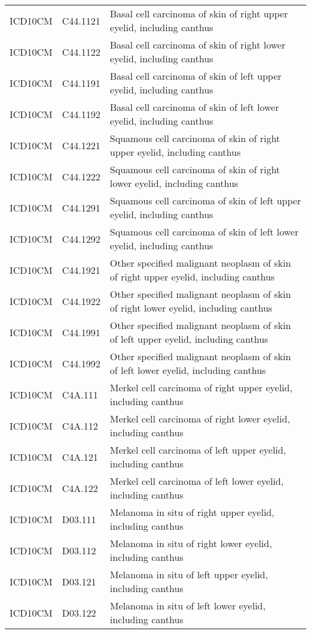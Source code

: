 \begin{longtable}{p{}p{}p{}}
  ICD10CM & C44.1121 & Basal cell carcinoma of skin of right upper eyelid, including canthus \\ 
  ICD10CM & C44.1122 & Basal cell carcinoma of skin of right lower eyelid, including canthus \\ 
  ICD10CM & C44.1191 & Basal cell carcinoma of skin of left upper eyelid, including canthus \\ 
  ICD10CM & C44.1192 & Basal cell carcinoma of skin of left lower eyelid, including canthus \\ 
  ICD10CM & C44.1221 & Squamous cell carcinoma of skin of right upper eyelid, including canthus \\ 
  ICD10CM & C44.1222 & Squamous cell carcinoma of skin of right lower eyelid, including canthus \\ 
  ICD10CM & C44.1291 & Squamous cell carcinoma of skin of left upper eyelid, including canthus \\ 
  ICD10CM & C44.1292 & Squamous cell carcinoma of skin of left lower eyelid, including canthus \\ 
  ICD10CM & C44.1921 & Other specified malignant neoplasm of skin of right upper eyelid, including canthus \\ 
  ICD10CM & C44.1922 & Other specified malignant neoplasm of skin of right lower eyelid, including canthus \\ 
  ICD10CM & C44.1991 & Other specified malignant neoplasm of skin of left upper eyelid, including canthus \\ 
  ICD10CM & C44.1992 & Other specified malignant neoplasm of skin of left lower eyelid, including canthus \\ 
  ICD10CM & C4A.111 & Merkel cell carcinoma of right upper eyelid, including canthus \\ 
  ICD10CM & C4A.112 & Merkel cell carcinoma of right lower eyelid, including canthus \\ 
  ICD10CM & C4A.121 & Merkel cell carcinoma of left upper eyelid, including canthus \\ 
  ICD10CM & C4A.122 & Merkel cell carcinoma of left lower eyelid, including canthus \\ 
  ICD10CM & D03.111 & Melanoma in situ of right upper eyelid, including canthus \\ 
  ICD10CM & D03.112 & Melanoma in situ of right lower eyelid, including canthus \\ 
  ICD10CM & D03.121 & Melanoma in situ of left upper eyelid, including canthus \\ 
  ICD10CM & D03.122 & Melanoma in situ of left lower eyelid, including canthus \\ 

\end{longtable}
